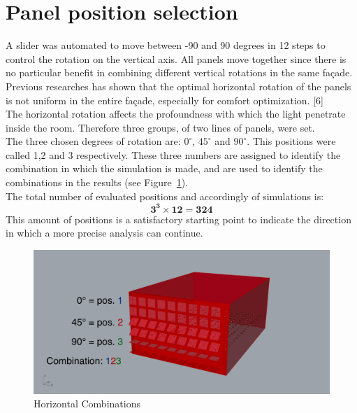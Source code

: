 \section{Panel position selection}
A slider was automated to move between -90 and 90 degrees in 12 steps to control the rotation on the vertical axis. All panels move together since there is no particular benefit in combining different vertical rotations in the same fa\c{c}ade.\\
Previous researches has shown that the optimal horizontal rotation of the panels is not uniform in the entire fa\c{c}ade, especially for comfort optimization. [6]\\
The horizontal rotation affects the profoundness with which the light penetrate inside the room. Therefore three groups, of two lines of panels, were set.\\
The three chosen degrees of rotation are: $0 ^\circ$, $45 ^\circ$  and  $90 ^\circ$. This positions were called 1,2 and 3 respectively. These three numbers are assigned to identify the combination in which the simulation is made, and are used to identify the combinations in the results (see Figure~\ref{123}).\\
The total number of evaluated positions and accordingly of simulations is:
\begin{equation}
   \textbf{3} ^{ \textbf{3}} \times  \textbf{12} =  \textbf{324} 
\end{equation}
This amount of positions is a satisfactory starting point to indicate the direction in which a more precise analysis can continue.

\begin{figure}[h]
 \centering
 \includegraphics[width=140mm]{graphic/123.png}
 \caption{Horizontal Combinations}
 \label{123}
\end{figure}